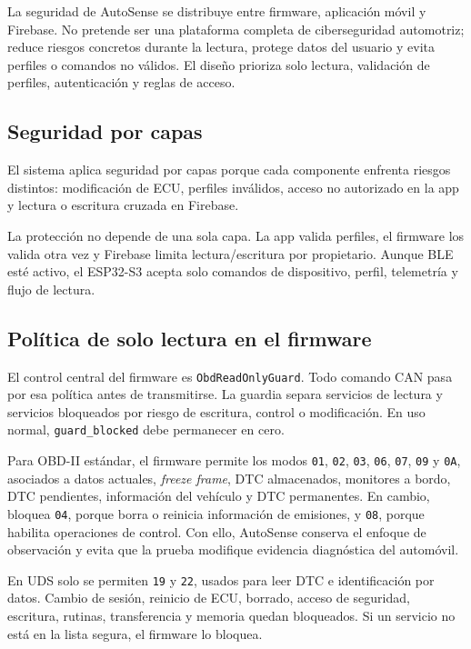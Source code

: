 \documentclass[12pt,letterpaper]{report}
\begin{document}
La seguridad de AutoSense se distribuye entre firmware, aplicación móvil y Firebase. No pretende ser una plataforma completa de ciberseguridad automotriz; reduce riesgos concretos durante la lectura, protege datos del usuario y evita perfiles o comandos no válidos. El diseño prioriza solo lectura, validación de perfiles, autenticación y reglas de acceso.

\subsection{Seguridad por capas}

El sistema aplica seguridad por capas porque cada componente enfrenta riesgos distintos: modificación de ECU, perfiles inválidos, acceso no autorizado en la app y lectura o escritura cruzada en Firebase.

La protección no depende de una sola capa. La app valida perfiles, el firmware los valida otra vez y Firebase limita lectura/escritura por propietario. Aunque BLE esté activo, el ESP32-S3 acepta solo comandos de dispositivo, perfil, telemetría y flujo de lectura.

\subsection{Política de solo lectura en el firmware}

El control central del firmware es \texttt{ObdReadOnlyGuard}. Todo comando CAN pasa por esa política antes de transmitirse. La guardia separa servicios de lectura y servicios bloqueados por riesgo de escritura, control o modificación. En uso normal, \texttt{guard\_blocked} debe permanecer en cero.

Para OBD-II estándar, el firmware permite los modos \texttt{01}, \texttt{02}, \texttt{03}, \texttt{06}, \texttt{07}, \texttt{09} y \texttt{0A}, asociados a datos actuales, \textit{freeze frame}, DTC almacenados, monitores a bordo, DTC pendientes, información del vehículo y DTC permanentes. En cambio, bloquea \texttt{04}, porque borra o reinicia información de emisiones, y \texttt{08}, porque habilita operaciones de control. Con ello, AutoSense conserva el enfoque de observación y evita que la prueba modifique evidencia diagnóstica del automóvil.

En UDS solo se permiten \texttt{19} y \texttt{22}, usados para leer DTC e identificación por datos. Cambio de sesión, reinicio de ECU, borrado, acceso de seguridad, escritura, rutinas, transferencia y memoria quedan bloqueados. Si un servicio no está en la lista segura, el firmware lo bloquea.
\end{document}
